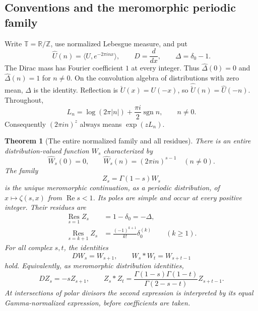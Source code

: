 \documentclass[11pt,letterpaper]{article}
\numberwithin{equation}{section}
\theoremstyle{plain}
\newtheorem{theorem}{Theorem}[section]
\theoremstyle{definition}
\theoremstyle{remark}
\begin{document}
\subsection{Conventions and the meromorphic periodic family}

Write $\mathbb T=\mathbb R/\mathbb Z$, use normalized Lebesgue measure,
and put
\[
 \widehat U(n)=\langle U,e^{-2\pi i n x}\rangle,\qquad
 D=\frac{d}{dx},\qquad \Delta=\delta_0-1.
\]
The Dirac mass has Fourier coefficient $1$ at every integer. Thus
$\widehat\Delta(0)=0$ and $\widehat\Delta(n)=1$ for $n\ne0$.
On the convolution algebra of distributions with zero mean, $\Delta$
is the identity. Reflection is $\check U(x)=U(-x)$, so
$\widehat{\check U}(n)=\widehat U(-n)$. Throughout,
\begin{equation}\label{per:eq:L}
 L_n=\log(2\pi |n|)+\frac{\pi i}{2}\operatorname{sgn}n,
 \qquad n\ne0.
\end{equation}
Consequently $(2\pi i n)^z$ always means $\exp(zL_n)$.

\begin{theorem}[The entire normalized family and all residues]
\label{per:thm:family}
There is an entire distribution-valued function $W_s$ characterized by
\begin{equation}\label{per:eq:W}
 \widehat W_s(0)=0,\qquad
 \widehat W_s(n)=(2\pi i n)^{s-1}\quad(n\ne0).
\end{equation}
The family
\begin{equation}\label{per:eq:Z}
 Z_s=\Gamma(1-s)W_s
\end{equation}
is the unique meromorphic continuation, as a periodic distribution, of
$x\mapsto\zeta(s,x)$ from $\operatorname{Re}s<1$. Its poles are simple
and occur at every positive integer. Their residues are
\begin{align}
 \operatorname*{Res}_{s=1} Z_s&=1-\delta_0=-\Delta,
 \label{per:eq:res1}\\
 \operatorname*{Res}_{s=k+1} Z_s
 &=\frac{(-1)^{k+1}}{k!}\delta_0^{(k)}\qquad(k\ge1).
 \label{per:eq:resk}
\end{align}
For all complex $s,t$, the identities
\begin{equation}\label{per:eq:group}
 DW_s=W_{s+1},\qquad W_s*W_t=W_{s+t-1}
\end{equation}
hold. Equivalently, as meromorphic distribution identities,
\begin{equation}\label{per:eq:meroconv}
 DZ_s=-sZ_{s+1},\qquad
 Z_s*Z_t=\frac{\Gamma(1-s)\Gamma(1-t)}{\Gamma(2-s-t)}Z_{s+t-1}.
\end{equation}
At intersections of polar divisors the second expression is interpreted
by its equal Gamma-normalized expression, before coefficients are taken.
\end{theorem}
\end{document}
